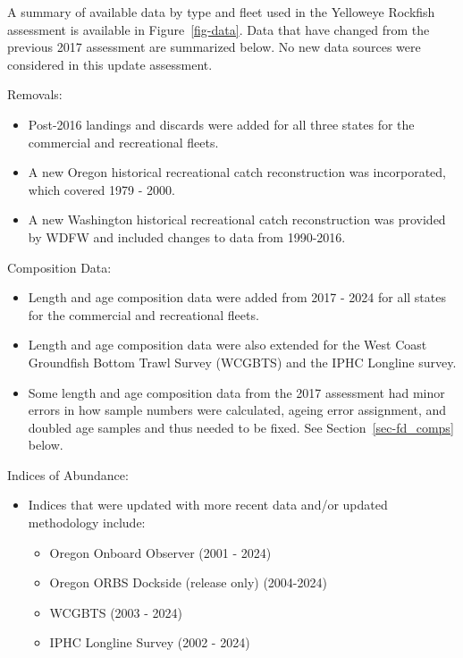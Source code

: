 \documentclass[
]{scrartcl}
\providecommand{\tightlist}{%
  \setlength{\itemsep}{0pt}\setlength{\parskip}{0pt}}\usepackage{longtable,booktabs,array}
\begin{document}
A summary of available data by type and fleet used in the Yelloweye
Rockfish assessment is available in Figure~\ref{fig-data}. Data that
have changed from the previous 2017 assessment are summarized below. No
new data sources were considered in this update assessment.

Removals:

\begin{itemize}
\tightlist
\item
  Post-2016 landings and discards were added for all three states for
  the commercial and recreational fleets.
\item
  A new Oregon historical recreational catch reconstruction was
  incorporated, which covered 1979 - 2000.
\item
  A new Washington historical recreational catch reconstruction was
  provided by WDFW and included changes to data from 1990-2016.
\end{itemize}

Composition Data:

\begin{itemize}
\tightlist
\item
  Length and age composition data were added from 2017 - 2024 for all
  states for the commercial and recreational fleets.
\item
  Length and age composition data were also extended for the West Coast
  Groundfish Bottom Trawl Survey (WCGBTS) and the IPHC Longline survey.
\item
  Some length and age composition data from the 2017 assessment had
  minor errors in how sample numbers were calculated, ageing error
  assignment, and doubled age samples and thus needed to be fixed. See
  Section~\ref{sec-fd_comps} below.
\end{itemize}

Indices of Abundance:

\begin{itemize}
\tightlist
\item
  Indices that were updated with more recent data and/or updated
  methodology include:

  \begin{itemize}
  \tightlist
  \item
    Oregon Onboard Observer (2001 - 2024)
  \item
    Oregon ORBS Dockside (release only) (2004-2024)
  \item
    WCGBTS (2003 - 2024)
  \item
    IPHC Longline Survey (2002 - 2024)
  \end{itemize}
\end{itemize}
\end{document}
